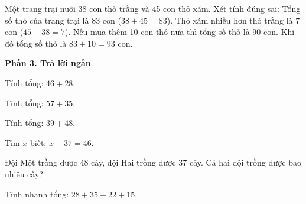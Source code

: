 \begin{ex} %
Một trang trại nuôi 38 con thỏ trắng và 45 con thỏ xám. Xét tính đúng sai:
\choiceTF
{\True Tổng số thỏ của trang trại là 83 con ($38 + 45 = 83$).}
{\True Thỏ xám nhiều hơn thỏ trắng là 7 con ($45 - 38 = 7$).}
{Nếu mua thêm 10 con thỏ nữa thì tổng số thỏ là 90 con.}
{\True Khi đó tổng số thỏ là $83 + 10 = 93$ con.}
\end{ex}

\textbf{Phần 3. Trả lời ngắn}

\begin{ex} %
Tính tổng: $46 + 28$.
\end{ex}

\begin{ex} %
Tính tổng: $57 + 35$.
\end{ex}

\begin{ex} %
Tính tổng: $39 + 48$.
\end{ex}

\begin{ex} %
Tìm $x$ biết: $x - 37 = 46$.
\end{ex}

\begin{ex} %
Đội Một trồng được 48 cây, đội Hai trồng được 37 cây. Cả hai đội trồng được bao nhiêu cây?
\end{ex}

\begin{ex} %
Tính nhanh tổng: $28 + 35 + 22 + 15$.
\end{ex}

